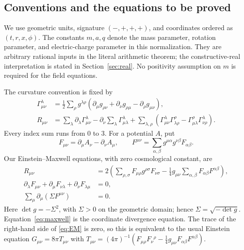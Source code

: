 \documentclass[11pt,a4paper]{article}
\numberwithin{equation}{section}
\theoremstyle{definition}\newtheorem{definition}[theorem]{Definition}
\theoremstyle{remark}\newtheorem{remark}[theorem]{Remark}
\begin{document}
\subsection{Conventions and the equations to be proved}
We use geometric units, signature $(-,+,+,+)$, and coordinates ordered as $(t,r,x,\phi)$. The constants $m,a,q$ denote the mass parameter, rotation parameter, and electric-charge parameter in this normalization. They are arbitrary rational inputs in the literal arithmetic theorem; the constructive-real interpretation is stated in Section~\ref{sec:real}. No positivity assumption on $m$ is required for the field equations.

The curvature convention is fixed by
\begin{align}
 \Gamma^\lambda_{\mu\nu}
 &=\frac12\sum_\rho g^{\lambda\rho}
 (\partial_\mu g_{\rho\nu}+\partial_\nu g_{\rho\mu}-\partial_\rho g_{\mu\nu}),\label{eq:gamma}\\
 R_{\mu\nu}
 &=\sum_\lambda\partial_\lambda\Gamma^\lambda_{\mu\nu}
   -\partial_\nu\sum_\lambda\Gamma^\lambda_{\mu\lambda}
   +\sum_{\lambda,\rho}
   (\Gamma^\lambda_{\mu\nu}\Gamma^\rho_{\lambda\rho}
    -\Gamma^\rho_{\mu\lambda}\Gamma^\lambda_{\nu\rho}).\label{eq:ricci}
\end{align}
Every index sum runs from $0$ to $3$. For a potential $A$, put
\begin{equation}
 F_{\mu\nu}=\partial_\mu A_\nu-\partial_\nu A_\mu,
 \qquad F^{\mu\nu}=\sum_{\alpha,\beta}g^{\mu\alpha}g^{\nu\beta}F_{\alpha\beta}.
\end{equation}
Our Einstein--Maxwell equations, with zero cosmological constant, are
\begin{align}
 R_{\mu\nu}&=2\left(\sum_{\rho,\sigma}F_{\mu\rho}g^{\rho\sigma}F_{\nu\sigma}
       -\frac14 g_{\mu\nu}\sum_{\alpha,\beta}F_{\alpha\beta}F^{\alpha\beta}\right),\label{eq:EM}\\
 \partial_\lambda F_{\mu\nu}+\partial_\mu F_{\nu\lambda}
  +\partial_\nu F_{\lambda\mu}&=0,\label{eq:dF}\\
 \sum_\mu\partial_\mu(\Sigma F^{\mu\nu})&=0.\label{eq:maxwell}
\end{align}
Here $\det g=-\Sigma^2$, with $\Sigma>0$ on the geometric domain; hence $\Sigma=\sqrt{-\det g}$. Equation~\eqref{eq:maxwell} is the coordinate divergence equation. The trace of the right-hand side of \eqref{eq:EM} is zero, so this is equivalent to the usual Einstein equation $G_{\mu\nu}=8\pi T_{\mu\nu}$ with $T_{\mu\nu}=(4\pi)^{-1}(F_{\mu\rho}F_\nu{}^\rho-\tfrac14g_{\mu\nu}F_{\alpha\beta}F^{\alpha\beta})$.
\end{document}
